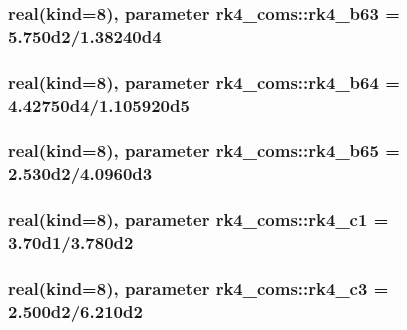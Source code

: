 \subsubsection[{rk4\+\_\+b63}]{\setlength{\rightskip}{0pt plus 5cm}real(kind=8), parameter rk4\+\_\+coms\+::rk4\+\_\+b63 = 5.\+750d2/1.\+38240d4}\label{namespacerk4__coms_a2943f8989d0d72c6913d114141dcfe5d}
\hypertarget{namespacerk4__coms_a6738b7b2098994211bfcafa79e4cc584}{}
\subsubsection[{rk4\+\_\+b64}]{\setlength{\rightskip}{0pt plus 5cm}real(kind=8), parameter rk4\+\_\+coms\+::rk4\+\_\+b64 = 4.\+42750d4/1.\+105920d5}\label{namespacerk4__coms_a6738b7b2098994211bfcafa79e4cc584}
\hypertarget{namespacerk4__coms_a5635aa326f6d3f256b21cb6aaf2d4ed0}{}
\subsubsection[{rk4\+\_\+b65}]{\setlength{\rightskip}{0pt plus 5cm}real(kind=8), parameter rk4\+\_\+coms\+::rk4\+\_\+b65 = 2.\+530d2/4.\+0960d3}\label{namespacerk4__coms_a5635aa326f6d3f256b21cb6aaf2d4ed0}
\hypertarget{namespacerk4__coms_a1dd142bdfa35986937ac4396a759dda0}{}
\subsubsection[{rk4\+\_\+c1}]{\setlength{\rightskip}{0pt plus 5cm}real(kind=8), parameter rk4\+\_\+coms\+::rk4\+\_\+c1 = 3.\+70d1/3.\+780d2}\label{namespacerk4__coms_a1dd142bdfa35986937ac4396a759dda0}
\hypertarget{namespacerk4__coms_a94a604a5d0d271bf875f0fd3338fef3e}{}
\subsubsection[{rk4\+\_\+c3}]{\setlength{\rightskip}{0pt plus 5cm}real(kind=8), parameter rk4\+\_\+coms\+::rk4\+\_\+c3 = 2.\+500d2/6.\+210d2}\label{namespacerk4__coms_a94a604a5d0d271bf875f0fd3338fef3e}
\hypertarget{namespacerk4__coms_ae29e60a0912723f4124b219bb67135d8}{}
